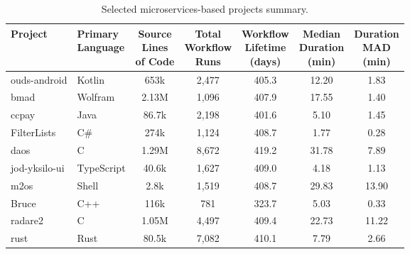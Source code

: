 \documentclass[conference]{IEEEconf}
\begin{document}
\begin{table}[!tbp]
\centering
    \fontsize{7.2}{8}\selectfont
    \tabcolsep=0.05cm
    \caption{Selected microservices-based projects summary.}
\label{tab:projects_overview}
\renewcommand{\arraystretch}{1.1}
\setlength{\tabcolsep}{3pt}
\begin{tabular}{llccccc}
\toprule
\textbf{Project} &
\makecell{\textbf{Primary}\\\textbf{Language}} &
\makecell{\textbf{Source}\\\textbf{Lines}\\\textbf{of Code}} &
\makecell{\textbf{Total}\\\textbf{Workflow}\\\textbf{Runs}} &
\makecell{\textbf{Workflow}\\\textbf{Lifetime}\\\textbf{(days)}} &
\makecell{\textbf{Median}\\\textbf{Duration}\\\textbf{(min)}} &
\makecell{\textbf{Duration}\\\textbf{MAD}\\\textbf{(min)}} \\
\midrule
ouds-android & Kotlin & 653k & 2,477 & 405.3 & 12.20 & 1.83 \\
bmad & Wolfram & 2.13M & 1,096 & 407.9 & 17.55 & 1.40 \\
ccpay & Java & 86.7k & 2,198 & 401.6 & 5.10 & 1.45 \\
FilterLists & C\# & 274k & 1,124 & 408.7 & 1.77 & 0.28 \\
daos & C & 1.29M & 8,672 & 419.2 & 31.78 & 7.89 \\
jod-yksilo-ui & TypeScript & 40.6k & 1,627 & 409.0 & 4.18 & 1.13 \\
m2os & Shell & 2.8k & 1,519 & 408.7 & 29.83 & 13.90 \\
Bruce & C++ & 116k & 781 & 323.7 & 5.03 & 0.33 \\
radare2 & C & 1.05M & 4,497 & 409.4 & 22.73 & 11.22 \\
rust & Rust & 80.5k & 7,082 & 410.1 & 7.79 & 2.66 \\
\bottomrule
\end{tabular}
\end{table}
\end{document}
